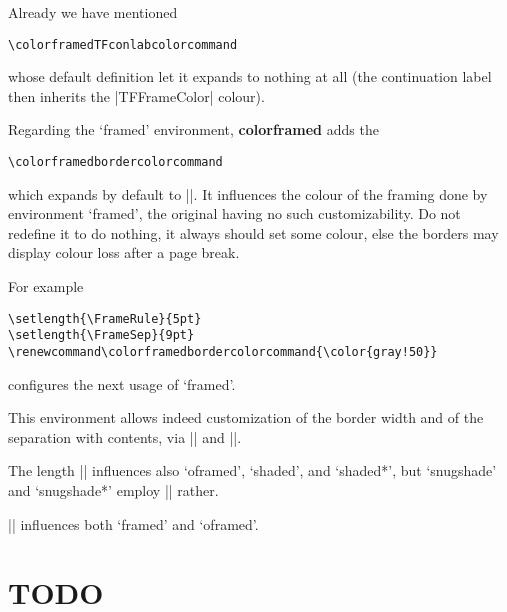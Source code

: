 \documentclass[a4paper,dvipdfmx,10pt,english]{article}
\def\colorframedTFconlabcolorcommand{\color{purple}}
\def\colorframedbordercolorcommand{\color{red!20}}
\newcommand\colorframed{%
        \texorpdfstring{{\color{joli}\bfseries colorframed}}{colorframed}\xspace}
\begin{document}
Already we have mentioned
\begin{verbatim}
\colorframedTFconlabcolorcommand
\end{verbatim}
whose default definition let it expands to nothing at all (the continuation label
then inherits the |TFFrameColor| colour).

Regarding the `framed' environment, \colorframed adds the
\begin{verbatim}
\colorframedbordercolorcommand
\end{verbatim}
which expands by default to |\normalcolor|.  It influences the colour of the
framing done by environment `framed', the original having no such
customizability.  Do not redefine it to do nothing, it always should set some
colour, else the borders may display colour loss after a page break.

For example
\begin{verbatim}
\setlength{\FrameRule}{5pt}
\setlength{\FrameSep}{9pt}
\renewcommand\colorframedbordercolorcommand{\color{gray!50}}
\end{verbatim}
configures the next usage of `framed'.

\setlength{\FrameRule}{5pt}
\setlength{\FrameSep}{9pt}
\renewcommand\colorframedbordercolorcommand{\color{gray!50}}
\begin{framed}
  This environment allows indeed customization of the border width
  and of the separation with contents, via |\FrameRule| and
  |\FrameSep|.

  The length |\FrameSep| influences also `oframed', `shaded', and `shaded*',
  but `snugshade' and `snugshade*' employ |\fboxsep| rather.

  |\FrameRule| influences both `framed' and `oframed'.
\end{framed}

\section{TODO}
\end{document}
